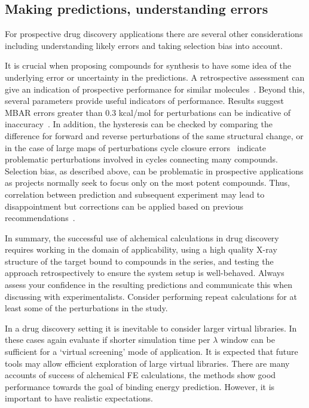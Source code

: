 \documentclass[9pt,bestpractices]{livecoms}
\begin{document}
%
\subsection{Making predictions, understanding errors}
\label{subsec:predictions}
For prospective drug discovery applications there are several other considerations including understanding likely errors and taking selection bias into account. 

It is crucial when proposing compounds for synthesis to have some idea of the underlying error or uncertainty in the predictions. A retrospective assessment can give an indication of prospective performance for similar molecules~\cite{ciordia2016application}. Beyond this, several parameters provide useful indicators of performance. Results suggest MBAR errors greater than 0.3 kcal/mol for perturbations can be indicative of inaccuracy~\cite{perez-benito2019predicting}. In addition, the hysteresis can be checked by comparing the difference for forward and reverse perturbations of the same structural change, or in the case of large maps of perturbations cycle closure errors~\cite{wang2013modeling} indicate problematic perturbations involved in cycles connecting many compounds. Selection bias, as described above, can be problematic in prospective applications as projects normally seek to focus only on the most potent compounds. Thus, correlation between prediction and subsequent experiment may lead to disappointment but corrections can be applied based on previous recommendations~\cite{abel2017critical}. 

In summary, the successful use of alchemical calculations in drug discovery requires working in the domain of applicability, using a high quality X-ray structure of the target bound to compounds in the series, and testing the approach retrospectively to ensure the system setup is well-behaved. Always assess your confidence in the resulting predictions and communicate this when discussing with experimentalists. Consider performing repeat calculations for at least some of the perturbations in the study. 

In a drug discovery setting it is inevitable to consider larger virtual libraries. In these cases again evaluate if shorter simulation time per $\lambda$ window can be sufficient for a ‘virtual screening’ mode of application. It is expected that future tools may allow efficient exploration of large virtual libraries. There are many accounts of success of alchemical FE calculations, the methods show good performance towards the goal of binding energy prediction. However, it is important to have realistic expectations. 
\end{document}
